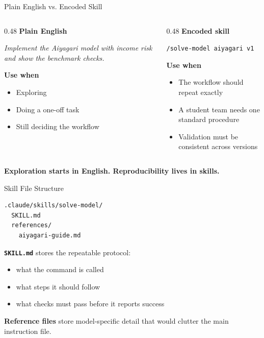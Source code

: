 \documentclass[10pt,english,aspectratio=169]{beamer}
\begin{document}
\begin{frame}{Plain English vs. Encoded Skill}
\begin{columns}[T]
\begin{column}{0.48\textwidth}
\textbf{Plain English}

\vspace{0.15cm}
\textit{Implement the Aiyagari model with income risk and show the benchmark checks.}

\vspace{0.2cm}
\textbf{Use when}
\begin{itemize}
    \item Exploring
    \item Doing a one-off task
    \item Still deciding the workflow
\end{itemize}
\end{column}
\begin{column}{0.48\textwidth}
\textbf{Encoded skill}

\vspace{0.15cm}
\texttt{/solve-model aiyagari v1}

\vspace{0.2cm}
\textbf{Use when}
\begin{itemize}
    \item The workflow should repeat exactly
    \item A student team needs one standard procedure
    \item Validation must be consistent across versions
\end{itemize}
\end{column}
\end{columns}

\vspace{0.25cm}

\textbf{Exploration starts in English. Reproducibility lives in skills.}
\end{frame}

\begin{frame}[fragile]{Skill File Structure}
\begin{lstlisting}[style=pythonstyle,language={},basicstyle=\ttfamily\tiny,numbers=none]
.claude/skills/solve-model/
  SKILL.md
  references/
    aiyagari-guide.md
\end{lstlisting}

\vspace{0.2cm}

\textbf{\texttt{SKILL.md}} stores the repeatable protocol:
\begin{itemize}
    \item what the command is called
    \item what steps it should follow
    \item what checks must pass before it reports success
\end{itemize}

\vspace{0.2cm}

\textbf{Reference files} store model-specific detail that would clutter the main instruction file.
\end{frame}
\end{document}
